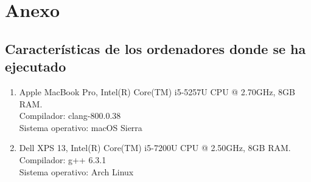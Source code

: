 \documentclass[11pt]{article}
\begin{document}
\newpage

\section*{Anexo}
\subsection*{Características de los ordenadores donde se ha ejecutado}

\vspace{0.5em}

\begin{enumerate}
\item Apple MacBook Pro, Intel(R) Core(TM) i5-5257U CPU @ 2.70GHz, 8GB RAM.\\  Compilador: clang-800.0.38 \\
  Sistema operativo: macOS Sierra
\item Dell XPS 13, Intel(R) Core(TM) i5-7200U CPU @ 2.50GHz, 8GB RAM.\\
  Compilador: g++ 6.3.1\\
  Sistema operativo: Arch Linux
\end{enumerate}
\end{document}
